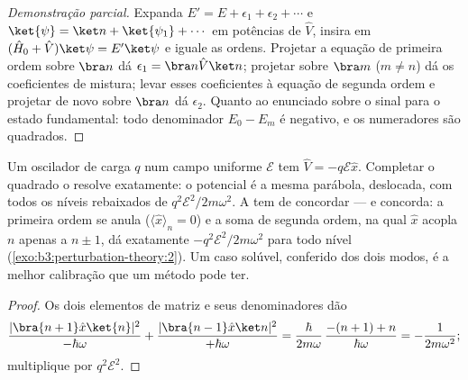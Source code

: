 \begin{proof}[Demonstração parcial]
Expanda $E' = E + \epsilon_1 + \epsilon_2 + \cdots$ e $\ket{\psi} =
\ket n + \ket{\psi_1} + \cdots$ em potências de $\hat V$, insira em
$(\hat H_0 + \hat V)\ket\psi = E'\ket\psi$ e iguale as ordens.
Projetar a equação de primeira ordem sobre $\bra n$ dá $\epsilon_1 =
\bra n\hat V\ket n$; projetar sobre $\bra m$ ($m \neq n$) dá os
coeficientes de mistura; levar esses coeficientes à equação de segunda
ordem e projetar de novo sobre $\bra n$ dá $\epsilon_2$. Quanto ao
enunciado sobre o sinal para o estado fundamental: todo denominador
$E_0 - E_m$ é negativo, e os numeradores são quadrados.
\end{proof}

\begin{proposition}\label{prop:b3:perturbation-theory:oscillator-field}
Um oscilador de carga $q$ num campo uniforme $\mathcal E$ tem
$\hat V = -q\mathcal E\hat x$. Completar o quadrado o resolve
exatamente: o potencial é a mesma parábola, deslocada, com todos os
níveis rebaixados de $q^2\mathcal E^2/2m\omega^2$. A  tem de concordar --- e concorda: a primeira ordem se anula
($\langle\hat
x\rangle_n = 0$) e a soma de segunda ordem, na qual $\hat x$ acopla $n$
apenas a $n \pm 1$, dá exatamente $-q^2\mathcal E^2/2m\omega^2$ para
todo nível (\cref{exo:b3:perturbation-theory:2}). Um caso solúvel,
conferido dos dois modos, é a melhor calibração que um método pode ter.
\end{proposition}

\begin{proof}
Os dois elementos de matriz e seus denominadores dão
\[
\frac{|\bra{n+1}\hat x\ket{n}|^2}{-\hbar\omega}
 + \frac{|\bra{n-1}\hat x\ket n|^2}{+\hbar\omega}
 = \frac{\hbar}{2m\omega}\,\frac{-(n+1) + n}{\hbar\omega}
 = -\frac{1}{2m\omega^2} ;
\]
multiplique por $q^2\mathcal E^2$.
\end{proof}

